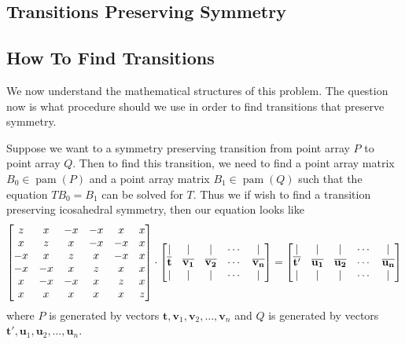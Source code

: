 \documentclass[a4paper,10pt]{article}
\theoremstyle{plain}
\theoremstyle{definition}
\theoremstyle{remark}
\renewcommand{\vec}[1]{\mathbf{#1}}
\DeclareMathOperator{\pam}{pam}
\begin{document}
\subsection{Transitions Preserving Symmetry}

\subsection{How To Find Transitions}
We now understand the mathematical structures of this problem.
The question now is what procedure should we use in order to find transitions that preserve symmetry.

Suppose we want to a symmetry preserving transition from point array \( P \) to point array \( Q \).
Then to find this transition, we need to find a point array matrix \( B_0 \in \pam(P) \) and a point array matrix \( B_1 \in \pam(Q) \) such that the equation \( TB_0 = B_1 \) can be solved for \( T \).
Thus we if wish to find a transition preserving icosahedral symmetry, then our equation looks like
\begin{equation}
	\begin{bmatrix}
		z  & x  & -x & -x & x  & x \\
		x  & z  & x  & -x & -x & x \\
		-x & x  & z  & x  & -x & x \\
		-x & -x & x  & z  & x  & x \\
		x  & -x & -x & x  & z  & x \\
		x  & x  & x  & x  & x  & z
	\end{bmatrix}
	\cdot
	\begin{bmatrix}
		| & | & | & \cdots & | \\
		\icobar{t} & \icobar{v_1} & \icobar{v_2} & \cdots & \icobar{v_n} \\
		| & | & | & \cdots & |
	\end{bmatrix}
	=
	\begin{bmatrix}
		| & | & | & \cdots & | \\
		\icobar{t'} & \icobar{u_1} & \icobar{u_2} & \cdots & \icobar{u_n} \\
		| & | & | & \cdots & |
	\end{bmatrix}
	\label{eq:general-ico-equation}
\end{equation}
where \( P \) is generated by vectors \(\vec{t}, \vec{v}_1, \vec{v}_2, \dots, \vec{v}_n\) and \( Q \) is generated by vectors \(\vec{t'}, \vec{u}_1, \vec{u}_2, \dots, \vec{u}_n\).
\end{document}
